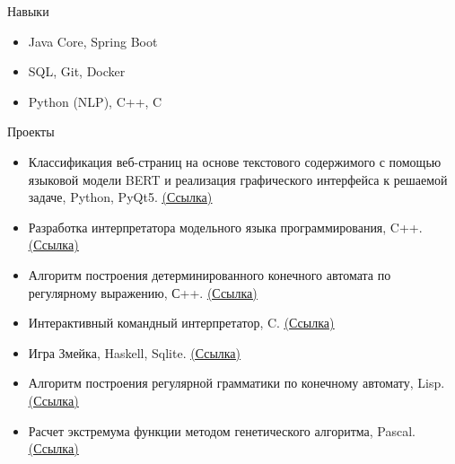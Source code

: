 \documentclass{resume} %
\begin{document}
\begin{rSection}{Навыки}
\begin{itemize}
  \item Java Core, Spring Boot
  \item SQL, Git, Docker
  \item Python (NLP), C++, C
\end{itemize}
\end{rSection}



\begin{rSection}{Проекты}
\begin{itemize}
\item {Классификация веб-страниц на основе текстового содержимого с помощью языковой модели BERT и реализация графического интерфейса к решаемой задаче, Python, PyQt5. \href{https://github.com/tymillnyc/diploma} {\underline {(Ссылка)}}}
\item {Разработка интерпретатора модельного языка программирования, C++. \href{https://github.com/tymillnyc/PLInterpreter} {\underline {(Ссылка)}}}
\item {Алгоритм построения детерминированного конечного автомата по регулярному выражению, С++. \href{https://github.com/tymillnyc/re2dfa} {\underline {(Ссылка)}}} 
\item {Интерактивный командный интерпретатор, C. \href{https://github.com/tymillnyc/myshell} {\underline {(Ссылка)}}} 
\item {Игра \textquotedbl{}Змейка\textquotedbl{}, Haskell, Sqlite. \href{https://github.com/tymillnyc/chervyak} {\underline {(Ссылка)}}} 
\item {Алгоритм построения регулярной грамматики по конечному автомату, Lisp. \href{https://github.com/tymillnyc/dfa2reggram} {\underline {(Ссылка)}}} 
\item {Расчет экстремума функции методом генетического алгоритма, Pascal. \href{https://github.com/tymillnyc/GeneticAlgorithm} {\underline {(Ссылка)}}} 
\end{itemize}
\end{rSection} 





\end{document}
